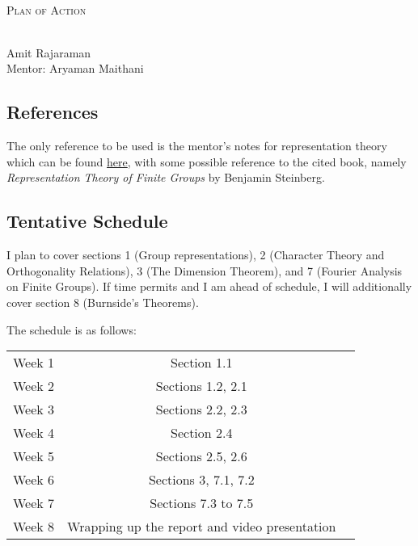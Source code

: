 \documentclass{article}
\newcommand{\myname}{Amit Rajaraman}
\newcommand{\topicname}{Plan of Action}
\renewcommand*{\titleBC}{\begingroup %
    \centering %
    
    \def\CP{\Huge \scshape \topicname} %
    
    \settowidth{\unitlength}{\CP} %
    \HRule{0.5pt} \\[0.6cm]
    {\CP} \\[\baselineskip] %
    \HRule{0.5pt} \\[0.5cm]
    \vspace{0.5cm}
    
    {\Large{\myname}}\\ %
    {\Large{Mentor: Aryaman Maithani}}
    
    \vspace{0.4cm}
\endgroup}
\begin{document}
\thispagestyle{empty}

\titleBC

\subsection*{References}

The only reference to be used is the mentor's notes for representation theory which can be found \href{https://aryamanmaithani.github.io/math/rep-theory/Notes.pdf}{here}, with some possible reference to the cited book, namely \emph{Representation Theory of Finite Groups} by Benjamin Steinberg.

\subsection*{Tentative Schedule}

I plan to cover sections 1 (Group representations), 2 (Character Theory and Orthogonality Relations), 3 (The Dimension Theorem), and 7 (Fourier Analysis on Finite Groups). If time permits and I am ahead of schedule, I will additionally cover section 8 (Burnside's Theorems).

The schedule is as follows:\\

\begin{center}
\begin{tabular}{|c|c|c|}
	\hline
	Week 1 & Section 1.1 \\
	Week 2 & Sections 1.2, 2.1 \\
	Week 3 & Sections 2.2, 2.3 \\
	Week 4 & Section 2.4 \\
	Week 5 & Sections 2.5, 2.6 \\
	Week 6 & Sections 3, 7.1, 7.2 \\
	Week 7 & Sections 7.3 to 7.5 \\
	Week 8 & Wrapping up the report and video presentation \\
	\hline
\end{tabular}
\end{center}
\end{document}
